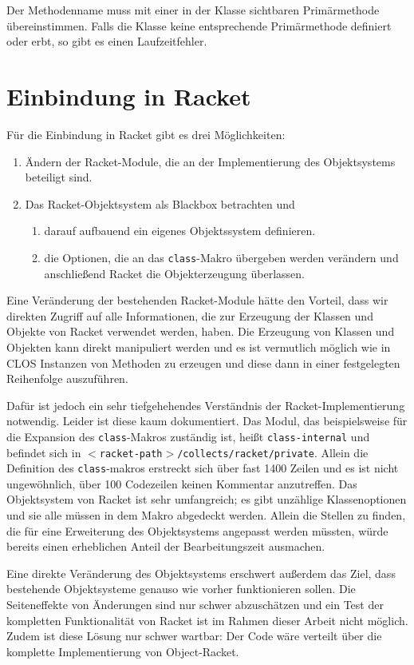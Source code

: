 Der Methodenname muss mit einer in der Klasse sichtbaren Primärmethode übereinstimmen. Falls die Klasse keine entsprechende Primärmethode definiert oder erbt, so gibt es einen Laufzeitfehler.

\section{Einbindung in Racket}
Für die Einbindung in Racket gibt es drei Möglichkeiten:
\begin{enumerate}
 \item Ändern der Racket-Module, die an der Implementierung des Objektsystems beteiligt sind.
 \item Das Racket-Objektsystem als Blackbox betrachten und 
 \begin{enumerate}
  \item darauf aufbauend ein eigenes Objektssystem definieren.
  \item die Optionen, die an das \texttt{class}-Makro übergeben werden verändern und anschließend Racket die Objekterzeugung überlassen.
 \end{enumerate}
\end{enumerate}

Eine Veränderung der bestehenden Racket-Module hätte den Vorteil, dass wir direkten Zugriff auf alle Informationen, die zur Erzeugung der Klassen und Objekte von Racket verwendet werden, haben. Die Erzeugung von Klassen und Objekten kann direkt manipuliert werden und es ist vermutlich möglich wie in CLOS Instanzen von Methoden zu erzeugen und diese dann in einer festgelegten Reihenfolge auszuführen. 

Dafür ist jedoch ein sehr tiefgehehendes Verständnis der Racket-Implementierung notwendig. Leider ist diese kaum dokumentiert. Das Modul, das beispielsweise für die Expansion des \texttt{class}-Makros zuständig ist, heißt \texttt{class-internal} und befindet sich in \texttt{$<$racket-path$>$/collects/racket/private}. Allein die Definition des \texttt{class}-makros erstreckt sich über fast 1400 Zeilen und es ist nicht ungewöhnlich, über 100 Codezeilen keinen Kommentar anzutreffen. Das Objektsystem von Racket ist sehr umfangreich; es gibt unzählige Klassenoptionen und sie alle müssen in dem Makro abgedeckt werden. Allein die Stellen zu finden, die für eine Erweiterung des Objektsystems angepasst werden müssten, würde bereits einen erheblichen Anteil der Bearbeitungszeit ausmachen.

Eine direkte Veränderung des Objektsystems erschwert außerdem das Ziel, dass bestehende Objektsysteme genauso wie vorher funktionieren sollen. Die Seiteneffekte von Änderungen sind nur schwer abzuschätzen und ein Test der kompletten Funktionalität von Racket ist im Rahmen dieser Arbeit nicht möglich. Zudem ist diese Lösung nur schwer wartbar: Der Code wäre verteilt über die komplette Implementierung von Object-Racket. 


